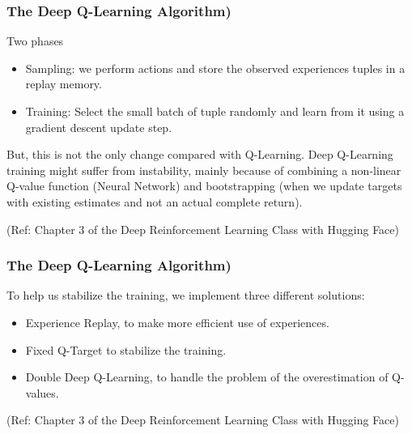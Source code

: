 \begin{frame}[fragile]\frametitle{The Deep Q-Learning Algorithm)}

Two phases

\begin{itemize}
\item Sampling: we perform actions and store the observed experiences tuples in a replay memory.
\item Training: Select the small batch of tuple randomly and learn from it using a gradient descent update step.
\end{itemize}

But, this is not the only change compared with Q-Learning. Deep Q-Learning training might suffer from instability, mainly because of combining a non-linear Q-value function (Neural Network) and bootstrapping (when we update targets with existing estimates and not an actual complete return).

{\tiny (Ref: Chapter 3 of the Deep Reinforcement Learning Class with Hugging Face)}

\end{frame}

\begin{frame}[fragile]\frametitle{The Deep Q-Learning Algorithm)}

To help us stabilize the training, we implement three different solutions:


\begin{itemize}
\item Experience Replay, to make more efficient use of experiences.
\item Fixed Q-Target to stabilize the training.
\item Double Deep Q-Learning, to handle the problem of the overestimation of Q-values.
\end{itemize}

{\tiny (Ref: Chapter 3 of the Deep Reinforcement Learning Class with Hugging Face)}

\end{frame}

